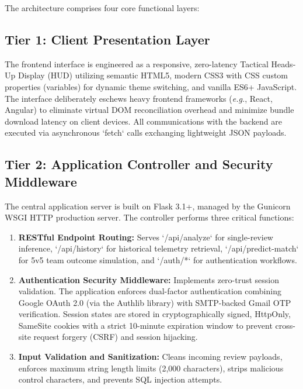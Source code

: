 The architecture comprises four core functional layers:

\subsection{Tier 1: Client Presentation Layer}
The frontend interface is engineered as a responsive, zero-latency Tactical Heads-Up Display (HUD) utilizing semantic HTML5, modern CSS3 with CSS custom properties (variables) for dynamic theme switching, and vanilla ES6+ JavaScript. The interface deliberately eschews heavy frontend frameworks (\textit{e.g.}, React, Angular) to eliminate virtual DOM reconciliation overhead and minimize bundle download latency on client devices. All communications with the backend are executed via asynchronous `fetch` calls exchanging lightweight JSON payloads.

\subsection{Tier 2: Application Controller and Security Middleware}
The central application server is built on Flask 3.1+, managed by the Gunicorn WSGI HTTP production server. The controller performs three critical functions:
\begin{enumerate}
    \item \textbf{RESTful Endpoint Routing:} Serves `/api/analyze` for single-review inference, `/api/history` for historical telemetry retrieval, `/api/predict-match` for 5v5 team outcome simulation, and `/auth/*` for authentication workflows.
    \item \textbf{Authentication Security Middleware:} Implements zero-trust session validation. The application enforces dual-factor authentication combining Google OAuth 2.0 (via the Authlib library) with SMTP-backed Gmail OTP verification. Session states are stored in cryptographically signed, HttpOnly, SameSite cookies with a strict 10-minute expiration window to prevent cross-site request forgery (CSRF) and session hijacking.
    \item \textbf{Input Validation and Sanitization:} Cleans incoming review payloads, enforces maximum string length limits (2,000 characters), strips malicious control characters, and prevents SQL injection attempts.
\end{enumerate}

